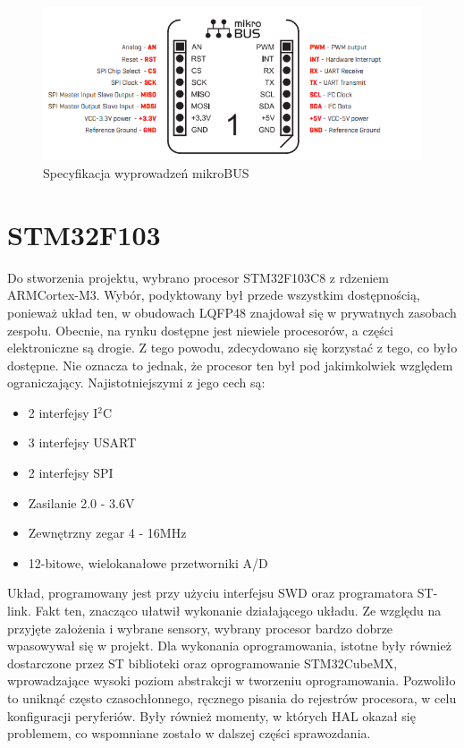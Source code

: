 \begin{figure}[H]
    \centering
    \includegraphics[width=12cm]{Graphics/mikrobus_pinout.png}
    \caption{Specyfikacja wyprowadzeń mikroBUS\texttrademark \cite{mikrobus_specification}}
    \label{img:mikrobus_pinout}
\end{figure}


\section{STM32F103}
Do stworzenia projektu, wybrano procesor STM32F103C8 z rdzeniem ARM\textregistered Cortex\textregistered-M3. Wybór, podyktowany był przede wszystkim dostępnością, ponieważ układ ten, w obudowach LQFP48 znajdował się w prywatnych zasobach zespołu. Obecnie, na rynku dostępne jest niewiele procesorów, a części elektroniczne są drogie. Z tego powodu, zdecydowano się korzystać z tego, co było dostępne. Nie oznacza to jednak, że procesor ten był pod jakimkolwiek względem ograniczający. Najistotniejszymi z jego cech są:
\begin{itemize}
    \item 2 interfejsy I$^2$C
    \item 3 interfejsy USART
    \item 2 interfejsy SPI
    \item Zasilanie 2.0 - 3.6V
    \item Zewnętrzny zegar 4 - 16MHz
    \item 12-bitowe, wielokanałowe przetworniki A/D
\end{itemize}
Układ, programowany jest przy użyciu interfejsu SWD oraz programatora ST-link. Fakt ten, znacząco ułatwił wykonanie działającego układu. Ze względu na przyjęte założenia i wybrane sensory, wybrany procesor bardzo dobrze wpasowywał się w projekt. Dla wykonania oprogramowania, istotne były również dostarczone przez ST biblioteki oraz oprogramowanie STM32CubeMX, wprowadzające wysoki poziom abstrakcji w tworzeniu oprogramowania. Pozwoliło to uniknąć często czasochłonnego, ręcznego pisania do rejestrów procesora, w celu konfiguracji peryferiów. Były również momenty, w których HAL okazał się problemem, co wspomniane zostało w dalszej części sprawozdania.

